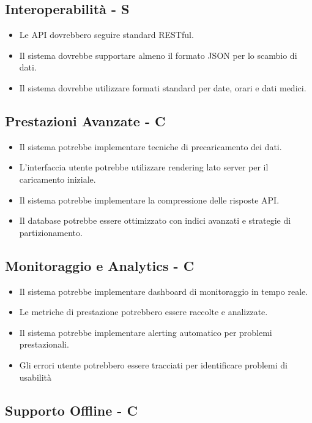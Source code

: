 \documentclass[12pt,a4paper,oneside]{report}
\begin{document}
\subsection{Interoperabilità - S}

\begin{itemize}
    \item Le API dovrebbero seguire standard RESTful.
    \item Il sistema dovrebbe supportare almeno il formato JSON per lo scambio di dati.
    \item Il sistema dovrebbe utilizzare formati standard per date, orari e dati medici.
\end{itemize}

\subsection{Prestazioni Avanzate - C}

\begin{itemize}
    \item Il sistema potrebbe implementare tecniche di precaricamento dei dati.
    \item L'interfaccia utente potrebbe utilizzare rendering lato server per il caricamento iniziale.
    \item Il sistema potrebbe implementare la compressione delle risposte API.
    \item Il database potrebbe essere ottimizzato con indici avanzati e strategie di partizionamento.
\end{itemize}

\subsection{Monitoraggio e Analytics - C}

\begin{itemize}
    \item Il sistema potrebbe implementare dashboard di monitoraggio in tempo reale.
    \item Le metriche di prestazione potrebbero essere raccolte e analizzate.
    \item Il sistema potrebbe implementare alerting automatico per problemi prestazionali.
    \item Gli errori utente potrebbero essere tracciati per identificare problemi di usabilità
\end{itemize}

\subsection{Supporto Offline - C}
\end{document}
